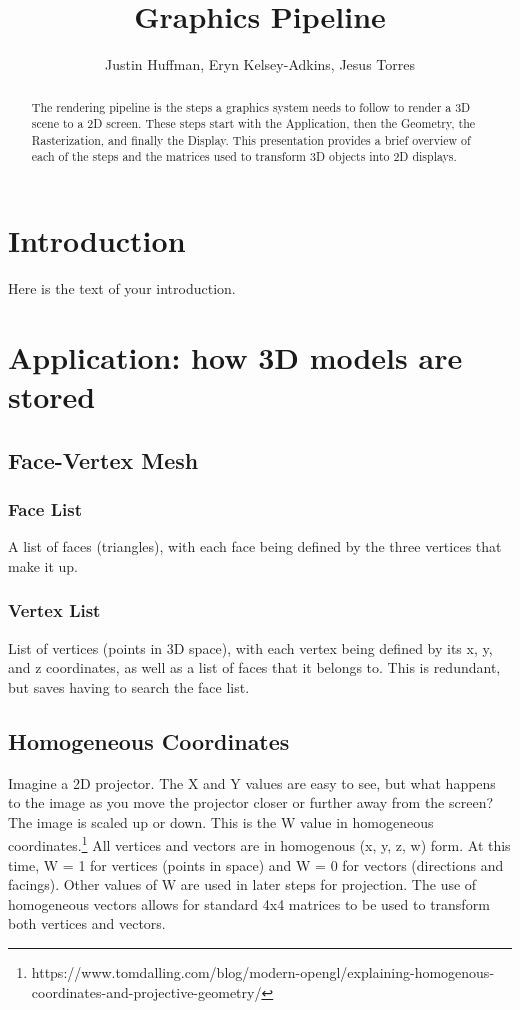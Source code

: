 \documentclass{article}
\begin{document}
\title{Graphics Pipeline}
\author{Justin Huffman, Eryn Kelsey-Adkins, Jesus Torres}

\maketitle

\begin{abstract}
The rendering pipeline is the steps a graphics system needs to follow to render a 3D scene to a 2D screen. These steps start with the Application, then the Geometry, the Rasterization, and finally the Display. This presentation provides a brief overview of each of the steps and the matrices used to transform 3D objects into 2D displays.
\end{abstract}

\section{Introduction}
Here is the text of your introduction.

\section{Application: how 3D models are stored}
\subsection{Face-Vertex Mesh}
\subsubsection{Face List}
A list of faces (triangles), with each face being defined by the three vertices that make it up.

\subsubsection{Vertex List}
List of vertices (points in 3D space), with each vertex being defined by its x, y, and z coordinates, as well as a list of faces that it belongs to. This is redundant, but saves having to search the face list.

\subsection{Homogeneous Coordinates}
Imagine a 2D projector. The X and Y values are easy to see, but what happens to the image as you move the projector closer or further away from the screen? The image is scaled up or down. This is the W value in homogeneous coordinates.\footnote[1]{https://www.tomdalling.com/blog/modern-opengl/explaining-homogenous-coordinates-and-projective-geometry/} All vertices and vectors are in homogenous (x, y, z, w) form. At this time, W = 1 for vertices (points in space) and W = 0 for vectors (directions and facings). Other values of W are used in later steps for projection. The use of homogeneous vectors allows for standard 4x4 matrices to be used to transform both vertices and vectors.
\end{document}
